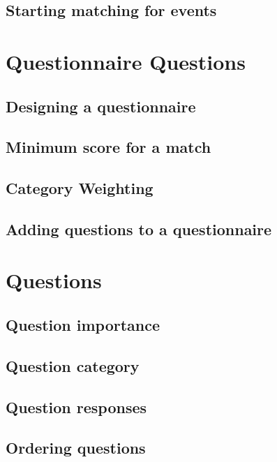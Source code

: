 \documentclass[a4paper,11pt,titlepage]{scrartcl}
\begin{document}
\subsection{Starting matching for events}

\clearpage
\section{Questionnaire Questions}
\label{sec:qquestions}

\subsection{Designing a questionnaire}

\subsection{Minimum score for a match}

\subsection{Category Weighting}

\subsection{Adding questions to a questionnaire}


\clearpage
\section{Questions}
\label{sec:questions}

\subsection{Question importance}
\label{sec:qimportance}

\subsection{Question category}
\label{sec:qcategory}

\subsection{Question responses}
\label{sec:qresponses}

\subsection{Ordering questions}
\label{sec:qordering}
\end{document}
